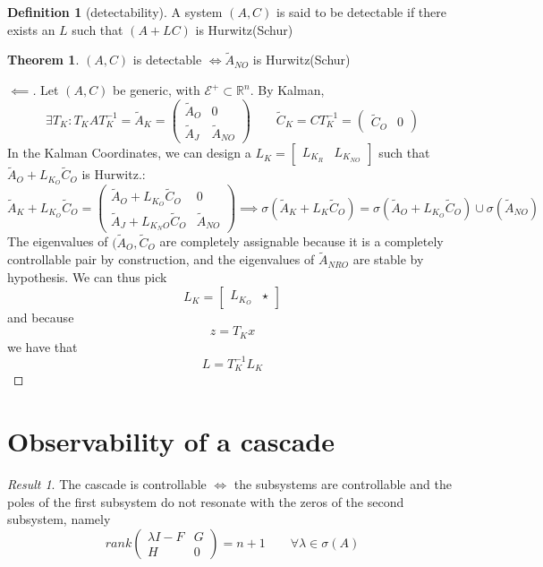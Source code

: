 \documentclass{book}
\newcommand{\R}{\mathbb{R}}
\theoremstyle{definition}
\newtheorem{definition}{Definition}[section]
\newtheorem{theorem}{Theorem}[section]
\theoremstyle{remark}
\theoremstyle{remark}
\newtheorem*{result}{Result}
\begin{document}
\begin{definition}[detectability]
    A system $(A,C)$ is said to be detectable if there exists an $L$ such that $(A+LC)$ is Hurwitz(Schur)
\end{definition}

\begin{theorem}
    $(A,C)$ is detectable $\iff\tilde{A}_{NO}$ is Hurwitz(Schur)
\end{theorem}
\begin{proof}[$\impliedby$]
    Let $(A,C)$ be generic, with $\mathcal{E}^+\subset \R^n$. By Kalman,
    \[
    \exists T_K:T_KAT_K^{-1}=\tilde{A}_K=\begin{pmatrix}
        \tilde{A}_O & 0\\
        \tilde{A}_J & \tilde{A}_{NO}
    \end{pmatrix} \qquad \tilde{C}_K=CT_K^{-1}=\begin{pmatrix}
        \tilde{C}_O & 0
    \end{pmatrix}
    \]
    In the Kalman Coordinates, we can design a $L_K=\begin{bmatrix}
        L_{K_R} & L_{K_{NO}}
    \end{bmatrix}$ such that $\tilde{A}_O+L_{K_O}\tilde{C}_O$ is Hurwitz.:
    \[
        \tilde{A}_K+L_{K_O}\tilde{C}_O=\begin{pmatrix}
            \tilde{A}_O+L_{K_O}\tilde{C}_O & 0\\
            \tilde{A}_J+L_{K_NO}\tilde{C}_O & \tilde{A}_{NO}
        \end{pmatrix} \implies \sigma(\tilde{A}_K+L_{K}\tilde{C}_O)=\sigma(\tilde{A}_O+L_{K_O}\tilde{C}_O)\cup \sigma(\tilde{A}_{NO})
    \]
    The eigenvalues of $(\tilde{A}_O,\tilde{C}_O$ are completely assignable because it is a completely controllable pair by construction, and the eigenvalues of $\tilde{A}_{NRO}$ are stable by hypothesis. We can thus pick
    \[
    L_K=\begin{bmatrix}
        L_{K_O} & \star
    \end{bmatrix}
    \]
    and because
    \[
    z=T_Kx
    \]
    we have that
    \[
    L=T_K^{-1}L_K
    \]
\end{proof}


\section{Observability of a cascade}
\begin{result}
    The cascade is controllable $\iff$ the subsystems are controllable and the poles of the first subsystem do not resonate with the zeros of the second subsystem, namely
    \[
    rank\begin{pmatrix}
        \lambda I - F & G\\
        H & 0
    \end{pmatrix}=n+1 \qquad \forall \lambda \in \sigma(A)
    \]
\end{result}
\end{document}
